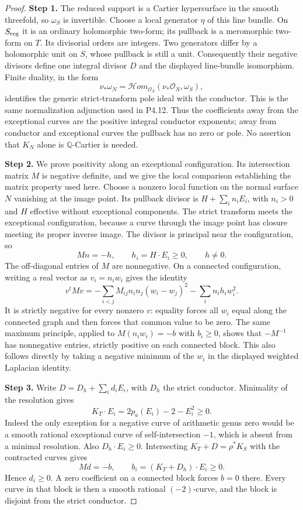 \begin{proof}
\noindent\textbf{Step 1.} The reduced support is a Cartier hypersurface in
the smooth threefold, so $\omega_S$ is invertible.
Choose a local generator $\eta$ of this line
bundle. On $S_{\rm reg}$ it is an ordinary
holomorphic two-form; its pullback is a
meromorphic two-form on $T$. Its divisorial
orders are integers. Two generators differ by
a holomorphic unit on $S$, whose pullback is
still a unit. Consequently their negative
divisors define one integral divisor $D$ and
the displayed line-bundle isomorphism.
Finite duality, in the form
\[
 \nu_*\omega_N
  =\mathcal Hom_{\mathcal O_S}
       (\nu_*\mathcal O_N,\omega_S),
\]
identifies the generic strict-transform pole
ideal with the conductor. This is the same
normalization adjunction used in P4.12. Thus
the coefficients away from the exceptional
curves are the positive integral conductor
exponents; away from conductor and exceptional
curves the pullback has no zero or pole.
No assertion that $K_N$ alone is
$\mathbb Q$-Cartier is needed.

\noindent\textbf{Step 2.} We prove positivity along an exceptional
configuration. Its intersection matrix $M$
is negative definite, and we give the local
comparison establishing the matrix property
used here. Choose a nonzero local function
on the normal surface $N$ vanishing at the
image point. Its pullback divisor is
$H+\sum_i n_iE_i$, with $n_i>0$ and $H$
effective without exceptional components.
The strict transform meets the exceptional
configuration, because a curve through the
image point has closure meeting its proper
inverse image. The divisor is principal
near the configuration, so
\[
 Mn=-h,\qquad h_i=H\cdot E_i\ge0,
 \qquad h\ne0.
\]
The off-diagonal entries of $M$ are
nonnegative. On a connected configuration,
writing a real vector as $v_i=n_iw_i$
gives the identity
\[
 v^tMv
 =-\sum_{i<j}M_{ij}n_in_j(w_i-w_j)^2
   -\sum_i n_ih_iw_i^2.
\]
It is strictly negative for every nonzero
$v$: equality forces all $w_i$ equal along
the connected graph and then forces that
common value to be zero. The same maximum
principle, applied to $M(n_iw_i)=-b$ with
$b_i\ge0$, shows that $-M^{-1}$ has
nonnegative entries, strictly positive on
each connected block. This also follows
directly by taking a negative minimum of
the $w_i$ in the displayed weighted
Laplacian identity.

\noindent\textbf{Step 3.} Write $D=D_h+\sum_i d_iE_i$, with $D_h$
the strict conductor. Minimality of the
resolution gives
\[
 K_T\cdot E_i=2p_a(E_i)-2-E_i^2\ge0.
\]
Indeed the only exception for a negative
curve of arithmetic genus zero would be
a smooth rational exceptional curve of
self-intersection $-1$, which is absent
from a minimal resolution. Also
$D_h\cdot E_i\ge0$. Intersecting
$K_T+D=\rho^*K_S$ with the contracted
curves gives
\[
 Md=-b,
 \qquad b_i=(K_T+D_h)\cdot E_i\ge0.
\]
Hence $d_i\ge0$. A zero coefficient on
a connected block forces $b=0$ there.
Every curve in that block is then a
smooth rational $(-2)$-curve, and the
block is disjoint from the strict
conductor.


\end{proof}
